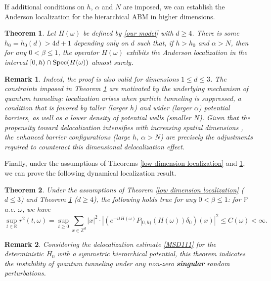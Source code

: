 \documentclass[11pt,reqno,UTF8,twoside]{amsart}
\newcommand{\Z}{\mathbb{Z}}
\newcommand{\R}{\mathbb{R}}
\newcommand{\spec}{{\rm Spec}}
\renewcommand{\P}{\mathbb{P}}
\newtheorem{thm}{Theorem}[section]
\newtheorem{rmk}{\bf Remark}[section]
\theoremstyle{definition}
\numberwithin{equation}{section}
\begin{document}
If additional conditions on $h$, $\alpha$ and $N$ are imposed,   we can establish the Anderson  localization  for the hierarchical ABM in  higher  dimensions. 

\begin{thm}\label{high dimension localization}
Let $H(\omega)$ be defined by \eqref{our model} with  $d \geq 4$. There is some  $h_0=h_0(d)>4d+1$  depending  only on $d$   such that,  if $h>h_0$ and $\alpha > N$, then for any $0<\beta\leq 1$,   the operator $H(\omega)$ exhibits  the Anderson localization in the interval $[0, h) \cap \spec(H(\omega))$ almost surely.
\end{thm}

\begin{rmk}
Indeed, the proof is also valid for dimensions $1\leq d\leq 3$. The constraints imposed in Theorem \ref{high dimension localization} are motivated by the underlying mechanism of quantum tunneling: localization arises when particle tunneling is suppressed, a condition that is favored by taller (larger 
$h$) and wider (larger $\alpha$) potential barriers, as well as a lower density of potential wells (smaller $N$). Given that the propensity toward delocalization intensifies with increasing spatial dimensions \cite{Bou03, LSZ25b}, the enhanced barrier configurations (large $h$, $\alpha > N$) are precisely the adjustments required to counteract this dimensional delocalization effect.
\end{rmk}


Finally, under the  assumptions of Theorems \ref{low dimension localization} and \ref{high dimension localization}, we  can prove the following   dynamical localization result.
\begin{thm}\label{dynamical localization} Under the assumptions of Theorem \ref{low dimension localization} ($d \leq 3$) and Theorem \ref{high dimension localization} ($d \geq 4$), the following holds  true for any $0 < \beta \leq 1$: for $\P$ a.e. $\omega$,  we have 
 \[\sup_{t\in\R} r^2(t,\omega) = \sup_{t\geq 0} \sum_{x\in \Z^d}  |x|^2\cdot \left| (e^{-itH(\omega)}P_{[0,h) }(H(\omega)) \delta_0) (x)  \right|^2\leq C(\omega)<\infty.\]   
\end{thm}
\begin{rmk}
Considering the delocalization estimate \eqref{MSD111} for the deterministic $H_0$ with a symmetric hierarchical potential,  this theorem  indicates  the instability of quantum tunneling  under   any non-zero  {\bf singular} random perturbations. 
\end{rmk}
\end{document}
